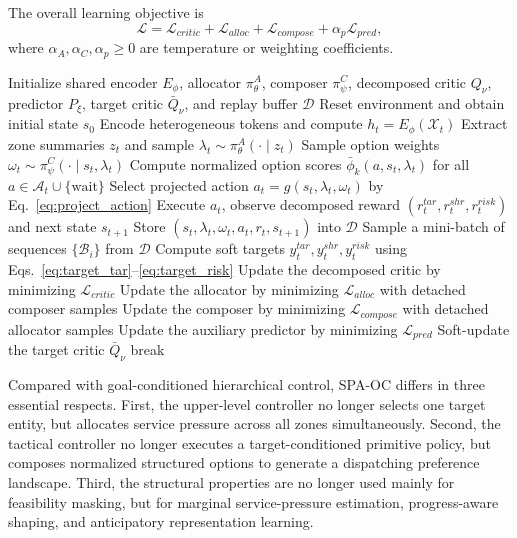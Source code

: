 \documentclass[a4paper,fleqn]{cas-sc}
\begin{document}
The overall learning objective is
\begin{equation}
\mathcal{L}=
\mathcal{L}_{critic}
+
\mathcal{L}_{alloc}
+
\mathcal{L}_{compose}
+
\alpha_p \mathcal{L}_{pred},
\label{eq:total_loss}
\end{equation}
where $\alpha_A,\alpha_C,\alpha_p\ge 0$ are temperature or weighting coefficients.

\begin{algorithm}[t]
\caption{Training procedure of SPA-OC}
\label{alg:spa_oc}
\begin{algorithmic}[1]
\STATE Initialize shared encoder $E_{\phi}$, allocator $\pi_{\theta}^{A}$, composer $\pi_{\psi}^{C}$, decomposed critic $Q_{\nu}$, predictor $P_{\xi}$, target critic $\bar Q_{\nu}$, and replay buffer $\mathcal{D}$
    \STATE Reset environment and obtain initial state $s_0$
        \STATE Encode heterogeneous tokens and compute $h_t=E_{\phi}(\mathcal{X}_t)$
        \STATE Extract zone summaries $z_t$ and sample $\lambda_t\sim\pi_{\theta}^{A}(\cdot\mid z_t)$
        \STATE Sample option weights $\omega_t\sim\pi_{\psi}^{C}(\cdot\mid s_t,\lambda_t)$
        \STATE Compute normalized option scores $\bar{\phi}_k(a,s_t,\lambda_t)$ for all $a\in\mathcal{A}_t\cup\{\mathrm{wait}\}$
        \STATE Select projected action $a_t=g(s_t,\lambda_t,\omega_t)$ by Eq.~\eqref{eq:project_action}
        \STATE Execute $a_t$, observe decomposed reward $(r_t^{tar},r_t^{shr},r_t^{risk})$ and next state $s_{t+1}$
        \STATE Store $(s_t,\lambda_t,\omega_t,a_t,r_t,s_{t+1})$ into $\mathcal{D}$
            \STATE Sample a mini-batch of sequences $\{\mathcal{B}_i\}$ from $\mathcal{D}$
            \STATE Compute soft targets $y_t^{tar},y_t^{shr},y_t^{risk}$ using Eqs.~\eqref{eq:target_tar}--\eqref{eq:target_risk}
            \STATE Update the decomposed critic by minimizing $\mathcal{L}_{critic}$
            \STATE Update the allocator by minimizing $\mathcal{L}_{alloc}$ with detached composer samples
            \STATE Update the composer by minimizing $\mathcal{L}_{compose}$ with detached allocator samples
            \STATE Update the auxiliary predictor by minimizing $\mathcal{L}_{pred}$
            \STATE Soft-update the target critic $\bar Q_{\nu}$
        \ENDIF
            \STATE break
        \ENDIF
    \ENDFOR
\ENDFOR
\end{algorithmic}
\end{algorithm}

Compared with goal-conditioned hierarchical control, SPA-OC differs in three essential respects. First, the upper-level controller no longer selects one target entity, but allocates service pressure across all zones simultaneously. Second, the tactical controller no longer executes a target-conditioned primitive policy, but composes normalized structured options to generate a dispatching preference landscape. Third, the structural properties are no longer used mainly for feasibility masking, but for marginal service-pressure estimation, progress-aware shaping, and anticipatory representation learning.
\end{document}

